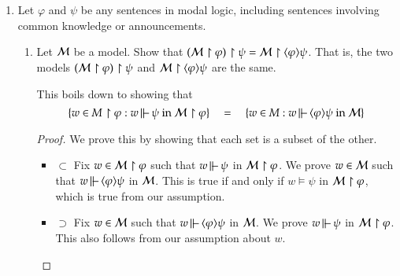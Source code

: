 \documentclass[11pt]{article}
\newcommand{\forces}{\,\mbox{$\mathrel\|\mathrel{\mkern-9mu}-\,$}}
\renewcommand{\phi}{\varphi}
\newcommand{\iiff}{\leftrightarrow}
\newcommand{\set}[1]{\{#1\}}
\newcommand{\pair}[1]{\langle #1\rangle}
\newcommand{\quadeq}{\quad = \quad}
\begin{document}
\begin{enumerate}
\begin{proof}
\begin{itemize}
    \item ($\leftarrow$) Next we assume $m \models \psi$ in $\Model$ and we show $m \models \pair{\phi}\psi$ in $\Model$ \\
      Consider the model $\Model(m)$ and notice that this is the same model as $(\Model \upharpoonright \phi)(m)$.
      Then it follows that $m \models \psi$ in $(\Model \upharpoonright \phi)(m) \iiff w \models \psi$ in $\Model(m)\upharpoonright \phi$.
      By problem 3, we have $m \models \psi$ in $\Model \upharpoonright \phi$, and thus $w \models \pair{\phi}\psi$ in $\Model$.
      
      
  \end{itemize}

\end{proof}


\item Let $\phi$ and $\psi$ be any sentences in modal logic, including sentences involving common knowledge or announcements.
\begin{enumerate}
\item Let $\Model$ be a model.   Show that $(\Model \upharpoonright \phi) \upharpoonright  \psi = \Model  \upharpoonright \pair{\phi}\psi$.
That is, the two models $(\Model \upharpoonright \phi) \upharpoonright  \psi $ and $ \Model  \upharpoonright \pair{\phi}\psi$
are the same.

This boils down to showing that 
\[
\set{w\in M\upharpoonright\phi : w \forces\psi\mbox{ in $\Model \upharpoonright \phi$}}
\quadeq
\set{w\in M : w \forces  \pair{\phi}\psi \mbox{ in $\Model$}}
\]

\begin{proof}
  We prove this by showing that each set is a subset of the other.
  \begin{itemize}
    \item $\subset$
      Fix $w \in \Model \upharpoonright \phi$ such that $w \forces \psi$ in $\Model \upharpoonright \phi$.
      We prove $w \in {\cal M}$ such that $w \forces \pair{\phi}\psi$ in $\Model$.
      This is true if and only if $w \models \psi$ in $\Model \upharpoonright \phi$, which is true from
      our assumption. 
    
    \item $\supset$
      Fix $w \in {\cal M}$ such that $w \forces \pair{\phi}\psi$ in $\Model$.
      We prove $w \forces \psi$ in $\Model \upharpoonright \phi$.
      This also follows from our assumption about $w$.

  \end{itemize} 


\end{proof}
\end{enumerate}
\end{enumerate}
\end{document}
